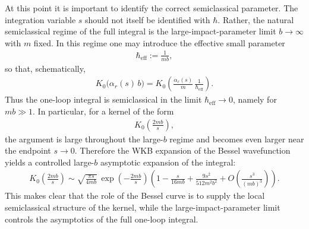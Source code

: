 At this point it is important to identify the correct semiclassical parameter. The integration variable \(s\) should not itself be identified with \(\hbar\). Rather, the natural semiclassical regime of the full integral is the large-impact-parameter limit \(b\to\infty\) with \(m\) fixed. In this regime one may introduce the effective small parameter
\begin{align}
    \hbar_{\mathrm{eff}}:=\frac{1}{mb},
\end{align}
so that, schematically,
\begin{align}
    K_0\!\big(\alpha_r(s)\,b\big)
    =
    K_0\!\left(\frac{\alpha_r(s)}{m}\,\frac{1}{\hbar_{\mathrm{eff}}}\right).
\end{align}
Thus the one-loop integral is semiclassical in the limit \(\hbar_{\mathrm{eff}}\to0\), namely for \(mb\gg1\). In particular, for a kernel of the form
\begin{align}
    K_0\!\left(\frac{2mb}{s}\right),
\end{align}
the argument is large throughout the large-\(b\) regime and becomes even larger near the endpoint \(s\to0\). Therefore the WKB expansion of the Bessel wavefunction yields a controlled large-\(b\) asymptotic expansion of the integral:
\begin{align}
    K_0\!\left(\frac{2mb}{s}\right)
    \sim
    \sqrt{\frac{\pi s}{4mb}}\,
    \exp\!\left(-\frac{2mb}{s}\right)
    \left(
        1-\frac{s}{16mb}
        +\frac{9s^2}{512m^2b^2}
        +O\!\left(\frac{s^3}{(mb)^3}\right)
    \right).
\end{align}
This makes clear that the role of the Bessel curve is to supply the local semiclassical structure of the kernel, while the large-impact-parameter limit controls the asymptotics of the full one-loop integral.\\
